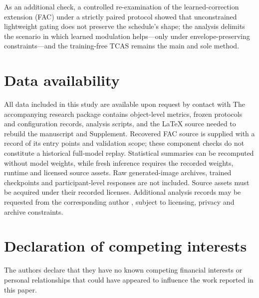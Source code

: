 \documentclass[times,twocolumn,final]{elsarticle}
\providecommand{\DIFadd}[1]{{\protect\color{blue} \sf #1}} %
\providecommand{\DIFdel}[1]{{\protect\color{red} \scriptsize #1}} %
\providecommand{\DIFaddbegin}{} %
\providecommand{\DIFaddend}{} %
\providecommand{\DIFdelbegin}{} %
\providecommand{\DIFdelend}{} %
\begin{document}
\DIFdel{As an additional check, a controlled re-examination of the learned-correction extension (FAC) under a strictly paired protocol showed that unconstrained lightweight gating does not preserve the schedule's shape; the analysis delimits the scenario in which learned modulation helps---only under envelope-preserving constraints---and the training-free TCAS remains the main and sole method. }%

\DIFdelend \section*{Data availability}

\DIFdelbegin \DIFdel{All data included in this study are available upon request by contact with }\DIFdelend \DIFaddbegin \DIFadd{The accompanying research package contains object-level metrics, frozen protocols and configuration records, analysis scripts, and the LaTeX source needed to rebuild the manuscript and Supplement. Recovered FAC source is supplied with a record of its entry points and validation scope; these component checks do not constitute a historical full-model replay. Statistical summaries can be recomputed without model weights, while fresh inference requires the recorded weights, runtime and licensed source assets. Raw generated-image archives, trained checkpoints and participant-level responses are not included. Source assets must be acquired under their recorded licenses. Additional analysis records may be requested from }\DIFaddend the corresponding author\DIFaddbegin \DIFadd{, subject to licensing, privacy and archive constraints}\DIFaddend .

\section*{Declaration of competing interests}

The authors declare that they have no known competing financial interests or personal relationships that could have appeared to influence the work reported in this paper.
\end{document}

